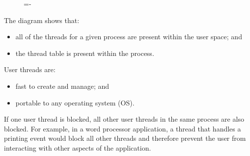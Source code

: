 \documentclass[a4paper]{systems-software}
\begin{document}
\begin{figure}[H]
  \lineskip=-\fboxrule
\end{figure}

The diagram shows that:
\begin{itemize}
	\item all of the threads for a given process are present within the user space; and
	\item the thread table is present within the process.
\end{itemize}

User threads are:
\begin{itemize}
	\item fast to create and manage; and
	\item portable to any operating system (OS).
\end{itemize}

If one user thread is blocked, all other user threads in the same process are also blocked. For example, in a word processor application, a thread that handles a printing event would block all other threads and therefore prevent the user from interacting with other aspects of the application.
\end{document}
